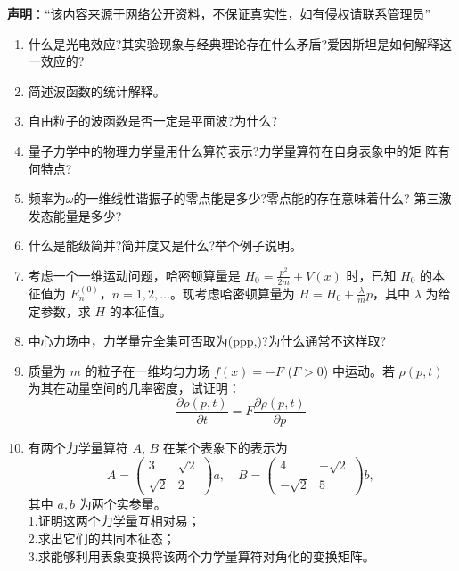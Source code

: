 
\textbf{声明}：“该内容来源于网络公开资料，不保证真实性，如有侵权请联系管理员”


\begin{enumerate}
\item 什么是光电效应?其实验现象与经典理论存在什么矛盾?爱因斯坦是如何解释这一效应的?
\item 简述波函数的统计解释。
\item 自由粒子的波函数是否一定是平面波?为什么?
\item 量子力学中的物理力学量用什么算符表示?力学量算符在自身表象中的矩
阵有何特点?
\item 频率为$\omega$的一维线性谐振子的零点能是多少?零点能的存在意味着什么?
第三激发态能量是多少?
\item 什么是能级简并?简并度又是什么?举个例子说明。
\item 考虑一个一维运动问题，哈密顿算量是 $H_0 = \frac{p^2}{2m} + V(x)$ 时，已知 $H_0$ 的本征值为 $E_n^{(0)}$，$n = 1, 2, \dots$。现考虑哈密顿算量为 $H = H_0 + \frac{\lambda}{m} p$，其中 $\lambda$ 为给定参数，求 $H$ 的本征值。
\item 中心力场中，力学量完全集可否取为(ppp,)?为什么通常不这样取?
\item 质量为 $m$ 的粒子在一维均匀力场 $f(x) = -F$ ($F > 0$) 中运动。若 $\rho(p, t)$ 为其在动量空间的几率密度，试证明：
$$\frac{\partial \rho(p, t)}{\partial t} = F \frac{\partial \rho(p, t)}{\partial p}~$$
\item 有两个力学量算符 $A$, $B$ 在某个表象下的表示为
$$A = \begin{pmatrix}3 & \sqrt{2} \\\sqrt{2} & 2\end{pmatrix} a, \quad B = \begin{pmatrix}4 & -\sqrt{2} \\-\sqrt{2} & 5\end{pmatrix} b,~$$
其中 $a, b$ 为两个实参量。\\
1.证明这两个力学量互相对易；\\
2.求出它们的共同本征态；\\
3.求能够利用表象变换将该两个力学量算符对角化的变换矩阵。\\
\end{enumerate}
